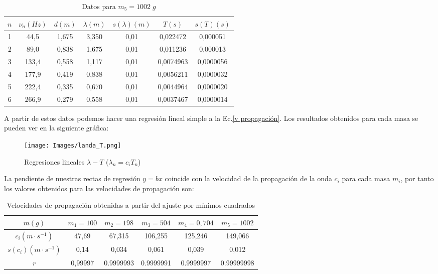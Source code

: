 \documentclass[a4paper,12pt,titlepage]{article}
\begin{document}
\begin{table}[h!]
    \centering
    \begin{tabular}{|c|c|c|c|c|c|c|}
    \hline
    $n$ & $\nu_n(Hz)$ & $d(m)$& $\lambda(m)$ & $s(\lambda)(m)$ &$T(s)$ & $s(T)(s)$ \\ \hline
    1 & 44,5  & 1,675 & 3,350 & 0,01 & 0,022472  & 0,000051  \\ \hline
    2 & 89,0    & 0,838 & 1,675 & 0,01 & 0,011236  & 0,000013  \\ \hline
    3 & 133,4 & 0,558 & 1,117 & 0,01 & 0,0074963 & 0,0000056 \\ \hline
    4 & 177,9 & 0,419 & 0,838 & 0,01 & 0,0056211 & 0,0000032 \\ \hline
    5 & 222,4 & 0,335 & 0,670 & 0,01 & 0,0044964 & 0,0000020 \\ \hline
    6 & 266,9 & 0,279 & 0,558 & 0,01 & 0,0037467 & 0,0000014 \\ \hline
    \end{tabular}
    \caption{Datos para $m_5=1002\;g$}
    \label{masa5}
    \end{table}

\newpage

A partir de estos datos podemos hacer una regresión lineal simple a la Ec.\ref{v propagación}. Los resultados obtenidos para cada masa se pueden ver en la siguiente gráfica:

\newpage

\begin{figure}[h!]
    \centering
    \texttt{[image: Images/landa\_T.png]}
    \caption{Regresiones lineales $\lambda-T$ ($\lambda_n=c_iT_n$)}
\end{figure}

La pendiente de nuestras rectas de regresión $y=bx$ coincide con la velocidad de la propagación de la onda $c_i$ para cada masa $m_i$, por tanto los valores obtenidos para las velocidades de propagación son:

\begin{table}[h!]
    \centering
    \begin{tabular}{|c|c|c|c|c|c|}
        \hline
        $m(g)$ & $m_1=100$ & $m_2=198$ & $m_3=504$ & $m_4=0,704$ & $m_5=1002$ \\ \hline
        $c_i(m\cdot s^{-1})$ & 47,69 & 67,315 & 106,255 & 125,246 & 149,066 \\ \hline
        $s(c_i)(m\cdot s^{-1})$ & 0,14 & 0,034 & 0,061 & 0,039 & 0,012 \\ \hline
        $r$ & 0,99997 & 0.9999993 & 0.9999991 & 0.9999997 & 0.99999998 \\ \hline
    \end{tabular}
    \caption{Velocidades de propagación obtenidas a partir del ajuste por mínimos cuadrados}
\end{table}
\end{document}
